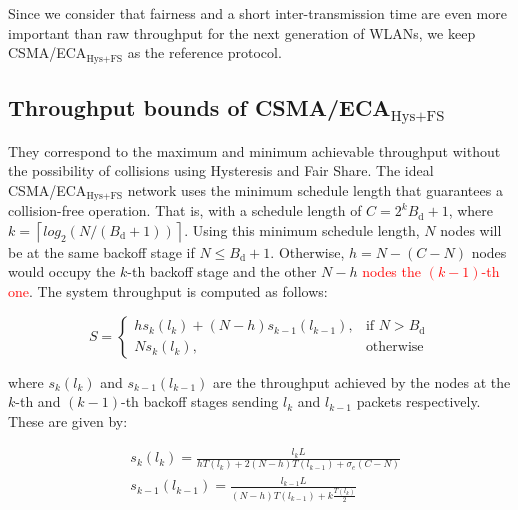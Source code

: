 	
	Since we consider that fairness and a short inter-transmission time are even more important than raw throughput for the next generation of WLANs, we keep CSMA/ECA$_{\text{Hys+FS}}$ as the reference protocol.
	
	\subsection{Throughput bounds of CSMA/ECA$_{\text{Hys+FS}}$}\label{ECA-bounds}
	
	They correspond to the maximum and minimum achievable throughput without the possibility of collisions using Hysteresis and Fair Share. The ideal CSMA/ECA$_{\text{Hys+FS}}$ network uses the minimum schedule length that guarantees a collision-free operation. That is, with a schedule length of $C=2^{k}B_{\text{d}}+1$, where $k = \left\lceil log_{2}(N/(B_{\text{d}}+1))\right\rceil$. Using this minimum schedule length, $N$ nodes will be at the same backoff stage if $N\leq B_{\text{d}}+1$. Otherwise, $h = N-(C-N)$ nodes would occupy the $k$-th backoff stage and the other $N-h$ \textcolor{red}{nodes the $(k-1)$-th one}. The system throughput is computed as follows:
	
	\begin{equation}
			S =
				\begin{cases}\label{eq:bound}
					hs_{k}(l_{k}) + (N-h)s_{k-1}(l_{k-1}), & \text{if } N > B_{\text{d}} \\
					Ns_{k}(l_{k}), & \text{otherwise}
				\end{cases}
	\end{equation}
	
	where $s_{k}(l_{k})$ and $s_{k-1}(l_{k-1})$ are the throughput achieved by the nodes at the $k$-th and $(k-1)$-th backoff stages sending $l_{k}$ and $l_{k-1}$ packets respectively. These are given by:
	
	\begin{subequations}
		\begin{align}
			&s_{k}(l_{k}) = \frac{l_{k} L}{hT(l_{k})+2(N-h)T(l_{k-1}) + \sigma_{e}(C - N)}\label{eq:HighNodes}\\
			&s_{k-1}(l_{k-1}) = \frac{l_{k-1} L}{(N-h)T(l_{k-1}) + k\frac{T(l_{k})}{2}}\label{eq:LowNodes}
		\end{align}
	\end{subequations}
	
